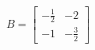 \documentclass[preview]{standalone}
\begin{document}
\begin{align*}
B = \left[\begin{matrix}- \frac{1}{2} & -2\\-1 & - \frac{3}{2}\end{matrix}\right]
\end{align*}
\end{document}
